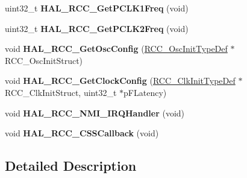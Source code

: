 \begin{DoxyCompactItemize}
uint32\+\_\+t {\bfseries H\+A\+L\+\_\+\+R\+C\+C\+\_\+\+Get\+P\+C\+L\+K1\+Freq} (void)
\item 
\mbox{\label{group___r_c_c___exported___functions___group2_gabbd5f8933a5ee05e4b3384e33026aca1}} 
uint32\+\_\+t {\bfseries H\+A\+L\+\_\+\+R\+C\+C\+\_\+\+Get\+P\+C\+L\+K2\+Freq} (void)
\item 
\mbox{\label{group___r_c_c___exported___functions___group2_gae2f9413fc447c2d7d6af3a8669c77b36}} 
void {\bfseries H\+A\+L\+\_\+\+R\+C\+C\+\_\+\+Get\+Osc\+Config} (\mbox{\hyperlink{struct_r_c_c___osc_init_type_def}{R\+C\+C\+\_\+\+Osc\+Init\+Type\+Def}} $\ast$R\+C\+C\+\_\+\+Osc\+Init\+Struct)
\item 
\mbox{\label{group___r_c_c___exported___functions___group2_gabc95375dfca279d88b9ded9d063d2323}} 
void {\bfseries H\+A\+L\+\_\+\+R\+C\+C\+\_\+\+Get\+Clock\+Config} (\mbox{\hyperlink{struct_r_c_c___clk_init_type_def}{R\+C\+C\+\_\+\+Clk\+Init\+Type\+Def}} $\ast$R\+C\+C\+\_\+\+Clk\+Init\+Struct, uint32\+\_\+t $\ast$p\+F\+Latency)
\item 
\mbox{\label{group___r_c_c___exported___functions___group2_ga0c124cf403362750513cae7fb6e6b195}} 
void {\bfseries H\+A\+L\+\_\+\+R\+C\+C\+\_\+\+N\+M\+I\+\_\+\+I\+R\+Q\+Handler} (void)
\item 
\mbox{\label{group___r_c_c___exported___functions___group2_gaa05b9157de5a48617bd06eb6aafa68aa}} 
void {\bfseries H\+A\+L\+\_\+\+R\+C\+C\+\_\+\+C\+S\+S\+Callback} (void)
\end{DoxyCompactItemize}


\subsection{Detailed Description}
